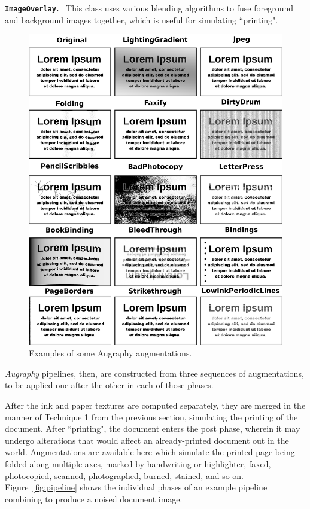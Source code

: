 \documentclass[runningheads]{llncs}
\begin{document}
\smallskip
\noindent\textbf{\texttt{ImageOverlay}.} ~This class uses various blending algorithms to fuse foreground and background images together, which is useful for simulating ``printing".

\begin{figure}
\includegraphics[width=\textwidth]{figures/augmentation-matrix.png}
\caption{Examples of some Augraphy augmentations.} \label{fig2}
\end{figure}

\emph{Augraphy} pipelines, then, are constructed from three sequences of augmentations, to be applied one after the other in each of those phases.

After the ink and paper textures are computed separately, they are merged in the manner of Technique 1 from the previous section, simulating the printing of the document.
After ``printing", the document enters the post phase, wherein it may undergo alterations that would affect an already-printed document out in the world.
Augmentations are available here which simulate the printed page being folded along multiple axes, marked by handwriting or highlighter, faxed, photocopied, scanned, photographed, burned, stained, and so on.
Figure~\ref{fig:pipeline} shows the individual phases of an example pipeline combining to produce a noised document image.
\end{document}
